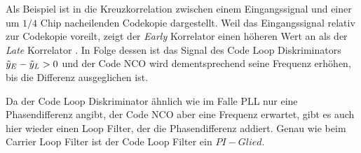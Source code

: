 Als Beispiel ist in  die Kreuzkorrelation zwischen einem Eingangssignal und einer um $1/4$ Chip nacheilenden Codekopie dargestellt. Weil das Eingangssignal relativ zur Codekopie voreilt, zeigt der \emph{Early} Korrelator \markerEarly einen höheren Wert an als der \emph{Late} Korrelator \markerLate. In Folge dessen ist das Signal des Code Loop Diskriminators  $\tilde{y}_E - \tilde{y}_L>0$ und der Code NCO wird dementsprechend seine Frequenz erhöhen, bis die Differenz ausgeglichen ist.



Da der Code Loop Diskriminator ähnlich wie im Falle PLL nur eine Phasendifferenz angibt, der Code NCO aber eine Frequenz erwartet, gibt es auch hier wieder einen Loop Filter, der die Phasendifferenz addiert. Genau wie beim Carrier Loop Filter ist der Code Loop Filter ein $PI-Glied$.

